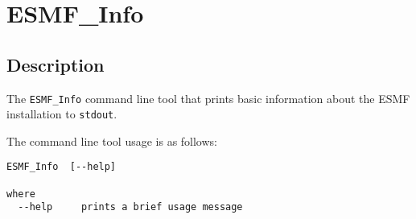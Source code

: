 
\section{ESMF\_Info}
\label{sec:ESMF_Info}

\subsection{Description}

The {\tt ESMF\_Info} command line tool that prints basic information about the
ESMF installation to {\tt stdout}.

The command line tool usage is as follows:

\begin{verbatim}
ESMF_Info  [--help]

where
  --help     prints a brief usage message
  
\end{verbatim}
